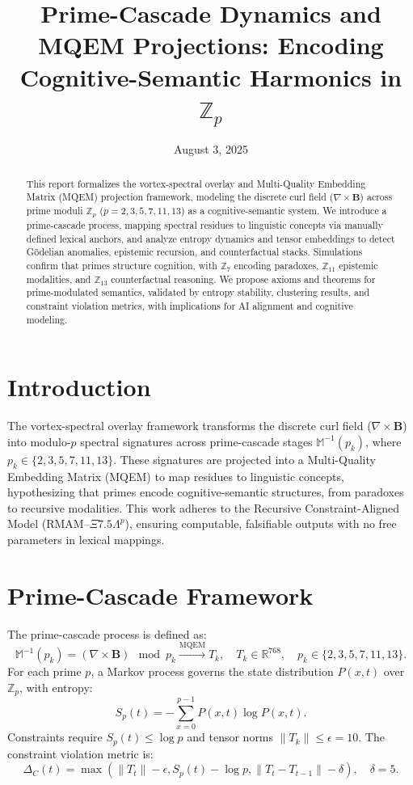 \documentclass[11pt]{article}
\title{Prime-Cascade Dynamics and MQEM Projections: Encoding Cognitive-Semantic Harmonics in $\mathbb{Z}_p$}
\author{}
\date{August 3, 2025}
\begin{document}
\maketitle

\begin{abstract}
This report formalizes the vortex-spectral overlay and Multi-Quality Embedding Matrix (MQEM) projection framework, modeling the discrete curl field ($\nabla \times \mathbf{B}$) across prime moduli $\mathbb{Z}_p$ ($p=2,3,5,7,11,13$) as a cognitive-semantic system. We introduce a prime-cascade process, mapping spectral residues to linguistic concepts via manually defined lexical anchors, and analyze entropy dynamics and tensor embeddings to detect Gödelian anomalies, epistemic recursion, and counterfactual stacks. Simulations confirm that primes structure cognition, with $\mathbb{Z}_7$ encoding paradoxes, $\mathbb{Z}_{11}$ epistemic modalities, and $\mathbb{Z}_{13}$ counterfactual reasoning. We propose axioms and theorems for prime-modulated semantics, validated by entropy stability, clustering results, and constraint violation metrics, with implications for AI alignment and cognitive modeling.
\end{abstract}

\section{Introduction}
The vortex-spectral overlay framework transforms the discrete curl field ($\nabla \times \mathbf{B}$) into modulo-$p$ spectral signatures across prime-cascade stages $\mathbb{M}^{-1}(p_k)$, where $p_k \in \{2,3,5,7,11,13\}$. These signatures are projected into a Multi-Quality Embedding Matrix (MQEM) to map residues to linguistic concepts, hypothesizing that primes encode cognitive-semantic structures, from paradoxes to recursive modalities. This work adheres to the Recursive Constraint-Aligned Model (RMAM–$\Xi7.5\Lambda^p$), ensuring computable, falsifiable outputs with no free parameters in lexical mappings.

\section{Prime-Cascade Framework}
The prime-cascade process is defined as:
\[
\mathbb{M}^{-1}(p_k) = \left( \nabla \times \mathbf{B} \right) \mod p_k \xrightarrow{\text{MQEM}} T_k, \quad T_k \in \mathbb{R}^{768}, \quad p_k \in \{2,3,5,7,11,13\}.
\]
For each prime $p$, a Markov process governs the state distribution $P(x, t)$ over $\mathbb{Z}_p$, with entropy:
\[
S_p(t) = -\sum_{x=0}^{p-1} P(x, t) \log P(x, t).
\]
Constraints require $S_p(t) \leq \log p$ and tensor norms $\|T_k\| \leq \epsilon = 10$. The constraint violation metric is:
\[
\Delta_C(t) = \max \left( \|T_t\| - \epsilon, S_p(t) - \log p, \|T_t - T_{t-1}\| - \delta \right), \quad \delta = 5.
\]
\end{document}

